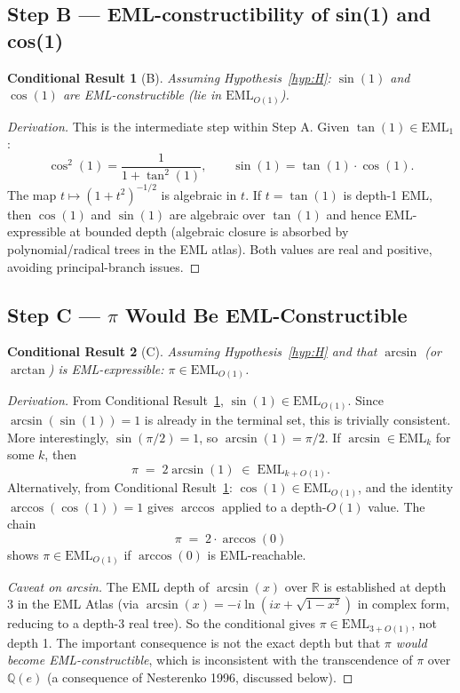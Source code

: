 \documentclass[11pt]{article}
\newtheorem{conditional}{Conditional Result}
\newcommand{\EML}[1]{\mathrm{EML}_{#1}}
\begin{document}
\subsection{Step B — EML-constructibility of sin(1) and cos(1)}

\begin{conditional}[B]\label{cond:B}
\emph{Assuming Hypothesis~\ref{hyp:H}:} $\sin(1)$ and $\cos(1)$ are
EML-constructible (lie in $\EML{O(1)}$).
\end{conditional}

\begin{proof}[Derivation]
This is the intermediate step within Step A.  Given $\tan(1) \in \EML{1}$:
\[
  \cos^2(1) = \frac{1}{1 + \tan^2(1)}, \qquad
  \sin(1) = \tan(1) \cdot \cos(1).
\]
The map $t \mapsto (1 + t^2)^{-1/2}$ is algebraic in $t$.  If $t = \tan(1)$
is depth-1 EML, then $\cos(1)$ and $\sin(1)$ are algebraic over $\tan(1)$ and
hence EML-expressible at bounded depth (algebraic closure is absorbed by
polynomial/radical trees in the EML atlas).  Both values are real and positive,
avoiding principal-branch issues.
\end{proof}

\subsection{Step C — $\pi$ Would Be EML-Constructible}

\begin{conditional}[C]\label{cond:C}
\emph{Assuming Hypothesis~\ref{hyp:H}} and that $\arcsin$ (or $\arctan$) is
EML-expressible: $\pi \in \EML{O(1)}$.
\end{conditional}

\begin{proof}[Derivation]
From Conditional Result~\ref{cond:B}, $\sin(1) \in \EML{O(1)}$.  Since
$\arcsin(\sin(1)) = 1$ is already in the terminal set, this is trivially
consistent.  More interestingly, $\sin(\pi/2) = 1$, so $\arcsin(1) = \pi/2$.
If $\arcsin \in \EML{k}$ for some $k$, then
\[
  \pi \;=\; 2\arcsin(1) \;\in\; \EML{k + O(1)}.
\]
Alternatively, from Conditional Result~\ref{cond:B}: $\cos(1) \in \EML{O(1)}$,
and the identity $\arccos(\cos(1)) = 1$ gives $\arccos$ applied to a depth-$O(1)$
value.  The chain
\[
  \pi \;=\; 2 \cdot \arccos(0)
\]
shows $\pi \in \EML{O(1)}$ if $\arccos(0)$ is EML-reachable.

\medskip
\noindent\emph{Caveat on arcsin.}  The EML depth of $\arcsin(x)$ over $\mathbb{R}$
is established at depth 3 in the EML Atlas (via $\arcsin(x) = -i \ln(ix +
\sqrt{1-x^2})$ in complex form, reducing to a depth-3 real tree).  So the
conditional gives $\pi \in \EML{3 + O(1)}$, not depth 1.  The important
consequence is not the exact depth but that \emph{$\pi$ would become
EML-constructible}, which is inconsistent with the transcendence of $\pi$ over
$\mathbb{Q}(e)$ (a consequence of Nesterenko 1996, discussed below).
\end{proof}
\end{document}
